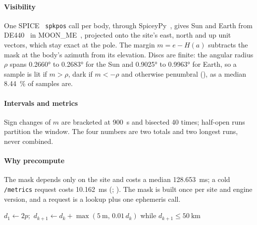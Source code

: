 \documentclass[conference]{IEEEtran}
\begin{document}
\paragraph{Visibility} One SPICE~\cite{acton1996naif,acton2018spice}
\texttt{spkpos} call per body, through SpiceyPy~\cite{annex2020spiceypy}, gives
Sun and Earth from DE440~\cite{park2021de440} in MOON\_ME~\cite{naif_moon_fk},
projected onto the site's east, north and up unit vectors, which stay exact at
the pole. The margin $m = e - H(a)$ subtracts the mask at the body's azimuth
from its elevation. Discs are finite: the angular radius $\rho$ spans
\ang{0.2660} to \ang{0.2683} for the Sun and \ang{0.9025} to \ang{0.9963} for
Earth, so a sample is lit if $m > \rho$, dark if $m < -\rho$ and otherwise
penumbral (), as a median \qty{8.44}{\percent} of samples are.

\paragraph{Intervals and metrics} Sign changes of $m$ are bracketed at
\qty{900}{\second} and bisected \num{40} times; half-open runs partition the
window. The four numbers are two totals and two longest runs, never combined.

\paragraph{Why precompute} The mask depends only on the site and costs a median
\qty{128.653}{\milli\second}; a cold \texttt{/metrics} request costs
\qty{10.162}{\milli\second} (; ). The mask is
built once per site and engine version, and a request is a lookup plus one
ephemeris call.

\begin{algorithm}[t]
\caption{Horizon mask for one site}
\label{alg:raymarch}
\DontPrintSemicolon
{}
$d_1 \gets 2p$;\ $d_{k+1} \gets d_k + \max(\qty{5}{\metre},\, 0.01\,d_k)$ while
$d_{k+1} \le \qty{50}{\kilo\metre}$\;
\end{algorithm}
\end{document}
